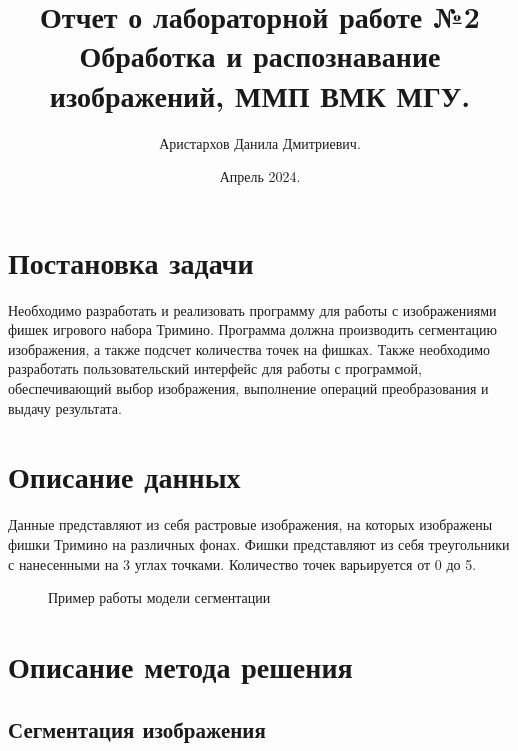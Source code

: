 \documentclass[11pt]{extarticle}
\title{Отчет о лабораторной работе №2 \\[6mm] \large Обработка и распознавание изображений, ММП ВМК МГУ.}
\author{Аристархов Данила Дмитриевич.}
\date{Апрель 2024.}
\begin{document}
\maketitle
{
  \hypersetup{linkcolor=black}
  \tableofcontents
}
\newpage

\section{Постановка задачи}
Необходимо разработать и реализовать программу для работы с изображениями фишек игрового набора Тримино. Программа должна производить сегментацию изображения, а также подсчет количества точек на фишках. Также необходимо разработать пользовательский интерфейс для работы с программой, обеспечивающий выбор изображения, выполнение операций преобразования и выдачу результата.

\section{Описание данных}
Данные представляют из себя растровые изображения, на которых изображены фишки Тримино на различных фонах. Фишки представляют из себя треугольники с нанесенными на 3 углах точками. Количество точек варьируется от 0 до 5.

\begin{figure}[h]
  \centering
  
  \caption{Пример работы модели сегментации}
  \label{fig:segmentate}
\end{figure}

\section{Описание метода решения}
\subsection{Сегментация изображения}
\end{document}
